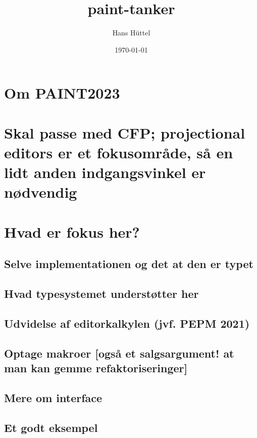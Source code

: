 \documentclass[11pt]{article}
\author{Hans Hüttel}
\date{\today}
\title{paint-tanker}
\begin{document}
\maketitle
\tableofcontents

\section{Om PAINT2023}
\label{sec-1}

\section{Skal passe med CFP; projectional editors er et fokusområde, så en lidt anden indgangsvinkel er nødvendig}
\label{sec-2}

\section{Hvad er fokus her?}
\label{sec-3}

\subsection{Selve implementationen og det at den er typet}
\label{sec-3-1}

\subsection{Hvad typesystemet understøtter her}
\label{sec-3-2}

\subsection{Udvidelse af editorkalkylen (jvf. PEPM 2021)}
\label{sec-3-3}

\subsection{Optage makroer [også et salgsargument! at man kan gemme refaktoriseringer]}
\label{sec-3-4}

\subsection{Mere om interface}
\label{sec-3-5}

\subsection{Et godt eksempel}
\label{sec-3-6}
\end{document}

